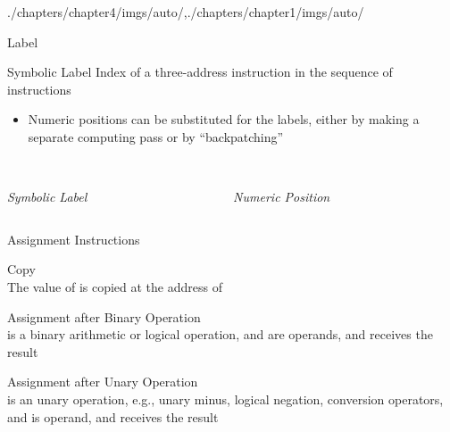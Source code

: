 \begin{graphicspathcontext}{{./chapters/chapter4/imgs/auto/},{./chapters/chapter1/imgs/auto/}}
\begin{bibunit}[apalike]
\begin{frame}[background=6]{Label}
	\begin{definitionblock}{Symbolic Label}
		Index of a three-address instruction in the sequence of instructions
	\end{definitionblock}
	\begin{itemize}
	\item Numeric positions can be substituted for the labels, either by making a separate computing pass or by ``backpatching''
	\end{itemize}
	\begin{columns}
		\begin{column}{.4\linewidth}
			\begin{center}
			\begin{tac}[\linewidth]
			\end{tac} \\[1em]
			\emph{Symbolic Label}
			\end{center}
		\end{column}
		\begin{column}{.5\linewidth}
			\begin{center}
			\begin{tac}[\linewidth]
			\end{tac} \\[1em]
			\emph{Numeric Position}
			\end{center}
		\end{column}
	\end{columns}
\end{frame}

\begin{frame}{Assignment Instructions}
	\begin{definitionblock}{Copy}
		\emph{} \\
		The value of  is copied at the address of 
	\end{definitionblock}
	\begin{definitionblock}{Assignment after Binary Operation}
		\emph{} \\
		 is a binary arithmetic or logical operation,  and  are operands, and  receives the result
	\end{definitionblock}
	\begin{definitionblock}{Assignment after Unary Operation}
		\emph{} \\
		 is an unary operation, e.g., unary minus, logical negation, conversion operators, and  is operand, and  receives the result
	\end{definitionblock}
\end{frame}


\end{bibunit}
\end{graphicspathcontext}
